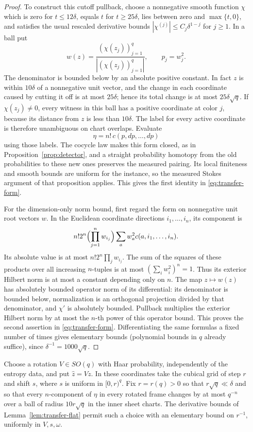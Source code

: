 \begin{proof}
To construct this cutoff pullback, choose a nonnegative smooth function \(\chi\)
which is zero for \(t\leq12\delta\), equals \(t\) for
\(t\geq25\delta\), lies between zero and \(\max\{t,0\}\), and satisfies the usual rescaled derivative bounds
\(|\chi^{(j)}|\leq C_j\delta^{1-j}\) for \(j\geq1\).  In a ball put
\[
       w(z)=\frac{(\chi(z_j))_{j=1}^q}{|(\chi(z_j))_{j=1}^q|},
       \qquad p_j=w_j^2.
\]
The denominator is bounded below by an absolute positive constant.
In fact \(z\) is within \(10\delta\) of a nonnegative unit vector, and
the change in each coordinate caused by cutting it off is at most
\(25\delta\); hence its total change is at most \(25\delta\sqrt q\).
If \(\chi(z_j)\ne0\), every witness in this ball has a positive
coordinate at color \(j\), because its distance from \(z\) is less
than \(10\delta\).  The label for every active coordinate is therefore
unambiguous on chart overlaps.  Evaluate
\[
                         \eta=n!\,c(p,dp,\ldots,dp)
\]
using those labels.  The cocycle law makes this form closed, as in
Proposition~\ref{prop:detector}, and a straight probability homotopy
from the old probabilities to these new ones preserves the measured
pairing.  Its local finiteness and smooth bounds are uniform for the
instance, so the measured Stokes argument of that proposition applies.
This gives the first identity in \eqref{eq:transfer-form}.

For the dimension-only norm bound, first regard the form on nonnegative
unit root vectors \(w\).  In the Euclidean coordinate directions
\(i_1,\ldots,i_n\), its component is
\[
 n!2^n\Bigl(\prod_{j=1}^n w_{i_j}\Bigr)
                \sum_a w_a^2 c(a,i_1,\ldots,i_n).
\]
Its absolute value is at most \(n!2^n\prod_j w_{i_j}\).  The sum of the
squares of these products over all increasing \(n\)-tuples is at most
\((\sum_i w_i^2)^n=1\).  Thus its exterior Hilbert norm is at most a
constant depending only on \(n\).  The map \(z\mapsto w(z)\) has
absolutely bounded operator norm of its differential: its denominator
is bounded below, normalization is an orthogonal projection divided by
that denominator, and \(\chi'\) is absolutely bounded.  Pullback
multiplies the exterior Hilbert norm by at most the \(n\)-th power of
this operator bound.  This proves the second assertion in
\eqref{eq:transfer-form}.  Differentiating the same formulas a fixed
number of times gives elementary bounds (polynomial bounds in \(q\)
already suffice), since \(\delta^{-1}=1000\sqrt q\).
\end{proof}

Choose a rotation \(V\in SO(q)\) with Haar probability, independently
of the entropy data, and put \(\widehat z=Vz\).  In these coordinates
take the cubical grid of step \(r\) and shift \(s\), where \(s\) is
uniform in \([0,r)^q\).  Fix \(r=r(q)>0\) so that
\(r\sqrt q\ll\delta\) and so that every \(n\)-component of \(\eta\)
in every rotated frame changes by at most \(q^{-n}\) over a ball of
radius \(10r\sqrt q\) in the inner sheet charts.  The derivative bounds
of Lemma~\ref{lem:transfer-flat} permit such a choice with an elementary
bound on \(r^{-1}\), uniformly in \(V,s,\omega\).

